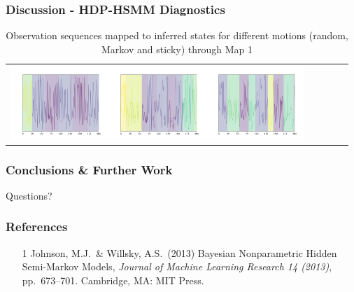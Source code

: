 \documentclass{beamer}
\begin{document}
\begin{frame}
    \frametitle{Discussion - HDP-HSMM Diagnostics}
    \newcommand{\addrandomseqa}{\includegraphics[width=10em]{images/hdphsmm/random-m1-seq.png}}
    \newcommand{\addmarkovseqa}{\includegraphics[width=10em]{images/hdphsmm/markov-m1-seq.png}}
    \newcommand{\addcorrseqa}{\includegraphics[width=10em]{images/hdphsmm/corr-m1-seq.png}}
    \begin{table}[H]
    \sffamily
    \centering
    \begin{tabular}{l*4{C}@{}}
    \addrandomseqa \addmarkovseqa \addcorrseqa \\
    \end{tabular}
    \caption{Observation sequences mapped to inferred states for different motions (random, Markov and sticky) through Map 1}
    \label{table:stateinfer}
    \end{table}
\end{frame}



\begin{frame}
	\frametitle{Conclusions \& Further Work}
\end{frame}

\begin{frame}
	\centering
	\huge{Questions?}
\end{frame}


\begin{frame}
    \frametitle{References}
    \begin{itemize}
        \item [1] Johnson, M.J.\ \& Willsky, A.S.\ (2013) Bayesian Nonparametric Hidden Semi-Markov Models, {\it Journal of Machine Learning Research 14 (2013)},
        pp.\ 673--701. Cambridge, MA: MIT Press.
    \end{itemize}
\end{frame}
\end{document}
